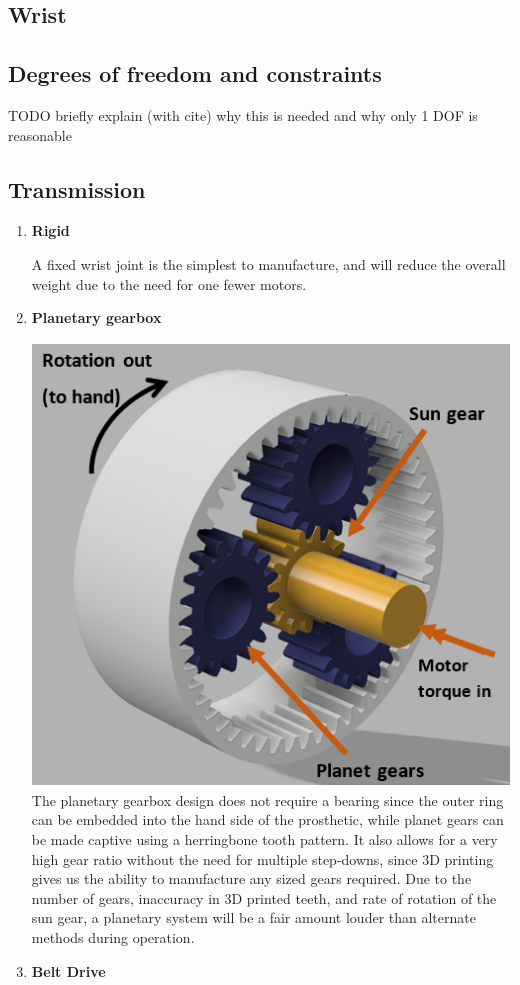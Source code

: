 \documentclass[12pt,3p]{report}
\begin{document}
\begin{multicols}{2}
		
		
	\section{Wrist}
	
		\subsection{Degrees of freedom and constraints}
		TODO briefly explain (with cite) why this is needed and why only 1 DOF is reasonable
		
		\subsection{Transmission}	
		
			
			\begin{enumerate}
			\item \textbf{Rigid} {
			
				A fixed wrist joint is the simplest to manufacture, and will reduce the overall weight due to the need for one fewer motors.
			}	
			\item \textbf{Planetary gearbox} {

\includegraphics[scale=0.6]{planet.PNG}
The planetary gearbox design does not require a bearing since the outer ring can be embedded into the hand side of the prosthetic, while planet gears can be made captive using a herringbone tooth pattern. It also allows for a very high gear ratio without the need for multiple step-downs, since 3D printing gives us the ability to manufacture any sized gears required. Due to the number of gears, inaccuracy in 3D printed teeth, and rate of rotation of the sun gear, a planetary system will be a fair amount louder than alternate methods during operation.
			}	
			\item \textbf{Belt Drive} {

}
\end{enumerate}
\end{multicols}
\end{document}
